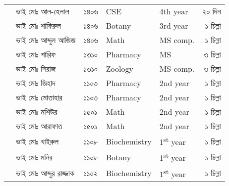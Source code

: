 \documentclass{article}
\newcounter{magicrownumbers}
\newcommand\rownumber{\stepcounter{magicrownumbers}\arabic{magicrownumbers}}
\begin{document}
\begin{tabular}{@{}lll
>{\selectlanguage{english}}l
>{\selectlanguage{english}}l
    r@{}}
\rownumber & ভাই মোঃ আল-হেলাল & ১৪০৬ & CSE & 4th year & ২০ দিন\\
\rownumber & ভাই মোঃ শাকিরুল & ১৪০৬ & Botany & 3rd year & ১ চিল্লা\\ 
\rownumber & ভাই মোঃ আব্দুল আজিজ & ১৪০৬ & Math & MS comp. & ১ চিল্লা\\
\rownumber & ভাই মোঃ শারিফ & ১৩১০ & Pharmacy & MS & ৩ চিল্লা\\
\rownumber & ভাই মোঃ সিরাজ & ১৩১০ & Zoology & MS comp. & ৩ চিল্লা\\  
\rownumber & ভাই মোঃ জিহাদ & ১১০৩ & Pharmacy & 2nd year & ১ চিল্লা\\ 
\rownumber & ভাই মোঃ মোতাহার & ১১০৩ & Pharmacy & 2nd year & ১ চিল্লা\\ 
\rownumber & ভাই মোঃ মশিউর & ১৫০১ & Math & 2nd year & ১ চিল্লা\\ 
\rownumber & ভাই মোঃ আরাফাত & ১৫০১ & Math & 2nd year & ১ চিল্লা\\
\rownumber & ভাই মোঃ খাইরুল & ১১০৮ & Biochemistry & 1\textsuperscript{st} year & ১ চিল্লা\\
\rownumber & ভাই মোঃ মনির  & ১১০৮ & Botany & 1\textsuperscript{st} year & ১ চিল্লা\\
\rownumber & ভাই মোঃ আব্দুর রাজ্জাক  & ১১০২ & Biochemistry & 1\textsuperscript{st} year & ১ চিল্লা \\
\bottomrule
\end{tabular}
\end{document}
